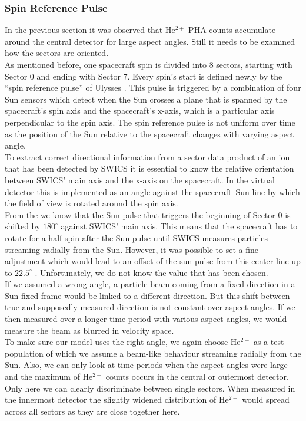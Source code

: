 \subsubsection{Spin Reference Pulse}
In the previous section it was observed that $\mathrm{He^{2+}}$ PHA counts accumulate around the central detector for large aspect angles. Still it needs to be examined how the sectors are oriented.\\
As mentioned before, one spacecraft spin is divided into 8 sectors, starting with Sector 0 and ending with Sector 7. Every spin's start is defined newly by the ``spin reference pulse'' of Ulysses \citep{hiscale}. This pulse is triggered by a combination of four Sun sensors which detect when the Sun crosses a plane that is spanned by the spacecraft's spin axis and the spacecraft's x-axis, which is a particular axis perpendicular to the spin axis. The spin reference pulse is not uniform over time as the position of the Sun relative to the spacecraft changes with varying aspect angle.\\
To extract correct directional information from a sector data product of an ion that has been detected by SWICS it is essential to know the relative orientation between SWICS' main axis and the x-axis on the spacecraft. In the virtual detector this is implemented as an angle against the spacecraft--Sun line by which the field of view is rotated around the spin axis.\\
From the \citet[][p. 20-22]{swics_dpu} we know that the Sun pulse that triggers the beginning of Sector 0 is shifted by $180^\circ$ against SWICS' main axis. This means that the spacecraft has to rotate for a half spin after the Sun pulse until SWICS measures particles streaming radially from the Sun. However, it was possible to set a fine adjustment which would lead to an offset of the sun pulse from this center line up to $22.5^\circ$ \citet[][p.48]{swics_dpu}. Unfortunately, we do not know the value that has been chosen.
\\
If we assumed a wrong angle, a particle beam coming from a fixed direction in a Sun-fixed frame would be linked to a different direction. But this shift between true and supposedly measured direction is not constant over aspect angles. If we then measured over a longer time period with various aspect angles, we would measure the beam as blurred in velocity space.
\\
To make sure our model uses the right angle, we again choose $\mathrm{He^{2+}}$ as a test population of which we assume a beam-like behaviour streaming radially from the Sun. Also, we can only look at time periods when the aspect angles were large and the maximum of $\mathrm{He^{2+}}$ counts occurs in the central or outermost detector. Only here we can clearly discriminate between single sectors. When measured in the innermost detector the slightly widened distribution of $\mathrm{He^{2+}}$ would spread across all sectors as they are close together here.

